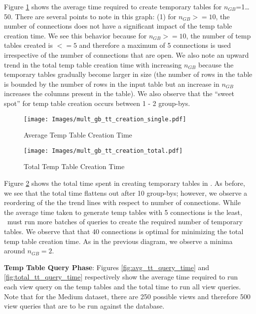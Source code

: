 Figure \ref{fig:avg_tt_creation} shows the
average time required to create temporary tables for $n_{GB}$=1\ldots50. There
are several points to note in this graph: (1) for $n_{GB}>=10$, the number of
connections does not have a significant impact of the temp table creation time.
We see this behavior because for $n_{GB}>=10$, the number of temp tables created
is $<=5$ and therefore a maximum of 5 connections is used irrespective of the
number of connections that are open.
We also note an upward trend in the total temp table creation time with
increasing $n_{GB}$ because the temporary tables gradually become larger in size
(the number of rows in the table is bounded by the number of rows in the input
table but an increase in $n_{GB}$ increases the columns present in the table).
We also observe that the ``sweet spot'' for temp table creation occurs between 1 -
2 group-bys. 


\begin{figure}[h]
  \centering
    \texttt{[image: Images/mult\_gb\_tt\_creation\_single.pdf]} 
  \caption{Average Temp Table Creation Time} 
    \label{fig:avg_tt_creation}
\end{figure}

\begin{figure}[h]
  \centering
    \texttt{[image: Images/mult\_gb\_tt\_creation\_total.pdf]}
  \caption{Total Temp Table Creation Time} 
    \label{fig:total_tt_creation_time}
\end{figure}

Figure \ref{fig:total_tt_creation_time} shows the total time spent in creating
temporary tables in \VizRecDB. As before, we see that the total time
flattens out after 10 group-bys; however, we observe a reordering of the the
trend lines with respect to number of connections. While the average time taken
to generate temp tables with 5 connections is the least, \VizRecDB\ must run more
batches of queries to create the required number of temporary tables. We observe
that that 40 connections is optimal for minimizing the total temp table creation
time. As in the previous diagram, we observe a minima around $n_{GB}=2$.

{\bf Temp Table Query Phase}: Figures \ref{fig:avg_tt_query_time} and
\ref{fig:total_tt_query_time} respectively show the average time required to run
each view query on the temp tables and the total time to run all view queries.
Note that for the Medium dataset, there are 250 possible views and therefore 500
view queries that are to be run against the database.

